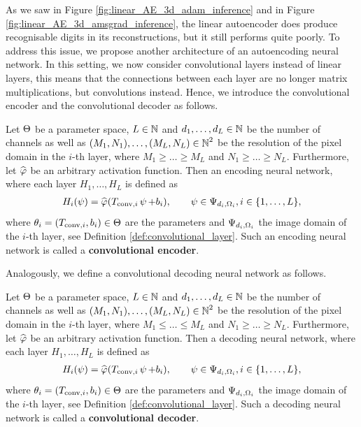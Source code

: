As we saw in Figure \ref{fig:linear_AE_3d_adam_inference} and in Figure \ref{fig:linear_AE_3d_amsgrad_inference}, the linear autoencoder does produce recognisable digits in its reconstructions, but it still performs quite poorly. To address this issue, we propose another architecture of an autoencoding neural network. In this setting, we now consider convolutional layers instead of linear layers, this means that the connections between each layer are no longer matrix multiplications, but convolutions instead. Hence, we introduce the convolutional encoder and the convolutional decoder as follows.


\begin{definition}\label{def_convolutional_encoder}
Let $\operatorname{\Theta}$ be a parameter space, $L\in \operatorname{\mathbb{N}}$ and $d_1,\ldots, d_L\in\operatorname{\mathbb{N}}$ be the number of channels as well as $(M_1,N_1),\ldots,(M_L,N_L) \in \operatorname{\mathbb{N}}^2$ be the resolution of the pixel domain in the $i$-th layer, where $M_1\geq \ldots \geq M_L$ and $N_1\geq \ldots \geq N_L$. Furthermore, let $\widehat{\operatorname{\varphi}}$ be an arbitrary activation function. Then an encoding neural network, where each layer $H_1,\ldots, H_L$ is defined as
\begin{align*}
H_i(\operatorname{\psi}) = \widehat{\operatorname{\varphi}}(T_{\text{conv}, i}\operatorname{\psi} + b_i), \qquad \operatorname{\psi} \in \Psi_{d_i,\Omega_i}, i \in \{1,\ldots, L\},
\end{align*}
where $\theta_i = (T_{\text{conv}, i}, b_i)\in\operatorname{\Theta}$ are the parameters and $\Psi_{d_i,\Omega_i}$ the image domain of the $i$-th layer, see Definition \ref{def:convolutional_layer}. Such an encoding neural network is called a \textbf{convolutional encoder}.
\end{definition}

Analogously, we define a convolutional decoding neural network as follows.

\begin{definition}\label{def_convolutional_decoder}
Let $\operatorname{\Theta}$ be a parameter space, $L\in \operatorname{\mathbb{N}}$ and $d_1,\ldots, d_L\in\operatorname{\mathbb{N}}$ be the number of channels as well as $(M_1,N_1),\ldots,(M_L,N_L) \in \operatorname{\mathbb{N}}^2$ be the resolution of the pixel domain in the $i$-th layer, where $M_1\leq \ldots \leq M_L$ and $N_1\geq \ldots \geq N_L$. Furthermore, let $\widehat{\operatorname{\varphi}}$ be an arbitrary activation function. Then a decoding neural network, where each layer $H_1,\ldots, H_L$ is defined as
\begin{align*}
H_i(\operatorname{\psi}) = \widehat{\operatorname{\varphi}}(T_{\text{conv}, i}\operatorname{\psi} + b_i), \qquad \operatorname{\psi} \in \Psi_{d_i,\Omega_i}, i \in \{1,\ldots, L\},
\end{align*}
where $\theta_i = (T_{\text{conv}, i}, b_i)\in\operatorname{\Theta}$ are the parameters and $\Psi_{d_i,\Omega_i}$ the image domain of the $i$-th layer, see Definition \ref{def:convolutional_layer}. Such a decoding neural network is called a \textbf{convolutional decoder}.
\end{definition}



